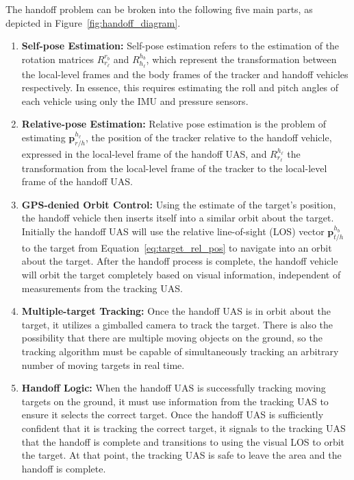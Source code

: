 The handoff problem can be broken into the following five main parts, as depicted in Figure~\ref{fig:handoff_diagram}.
\begin{enumerate}
    \item \textbf{Self-pose Estimation: }
        Self-pose estimation refers to the estimation of the rotation matrices $R_{r_\ell}^{r_b}$ and $R_{h_\ell}^{h_b}$, which represent the transformation between the local-level frames and the body frames of the tracker and handoff vehicles respectively.  In essence, this requires estimating the roll and pitch angles of each vehicle using only the IMU and pressure sensors.  
    \item \textbf{Relative-pose Estimation: }
        Relative pose estimation is the problem of estimating $\mathbf{p}_{r/h}^{h_\ell}$, the position of the tracker relative to the handoff vehicle, expressed in the local-level frame of the handoff UAS, and $R_{r_\ell}^{h_\ell}$ the transformation from the local-level frame of the tracker to the local-level frame of the handoff UAS.  
    \item \textbf{GPS-denied Orbit Control: }
        Using the estimate of the target's position, the handoff vehicle then inserts itself into a similar orbit about the target.
        Initially the handoff UAS will use the relative line-of-sight (LOS) vector $\mathbf{p}_{t/h}^{h_b}$ to the target from Equation~\eqref{eq:target_rel_pos} to navigate into an orbit about the target. After the handoff process is complete, the handoff vehicle will orbit the target completely based on visual information, independent of measurements from the tracking UAS.
    \item \textbf{Multiple-target Tracking: }
        Once the handoff UAS is in orbit about the target, it utilizes a gimballed camera to track the target.
        There is also the possibility that there are multiple moving objects on the ground, so the tracking algorithm must be capable of simultaneously tracking an arbitrary number of moving targets in real time.  
    \item \textbf{Handoff Logic: }
        When the handoff UAS is successfully tracking moving targets on the ground, it must use information from the tracking UAS to ensure it selects the correct target.
        Once the handoff UAS is sufficiently confident that it is tracking the correct target, it signals to the tracking UAS that the handoff is complete and transitions to using the visual LOS to orbit the target.  At that point, the tracking UAS is safe to leave the area and the handoff is complete.  
\end{enumerate}

